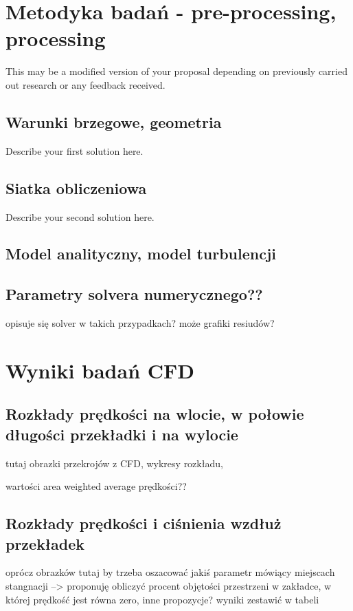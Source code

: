 \documentclass[peerreview]{IEEEtran}
\begin{document}

\section{Metodyka badań - pre-processing, processing}
This may be a modified version of your proposal depending on previously carried out research or any feedback received.  
\subsection{Warunki brzegowe, geometria}
Describe your first solution here.
\subsection{Siatka obliczeniowa}
Describe your second solution here.
\subsection{Model analityczny, model turbulencji}
\subsection{Parametry solvera numerycznego??}

opisuje się solver w takich przypadkach? może grafiki resiudów?



\section{Wyniki badań CFD} \label{sec:criteria}
\subsection{Rozkłady prędkości na wlocie, w połowie długości przekładki i na wylocie}
tutaj obrazki przekrojów z CFD, wykresy rozkładu, 

wartości area weighted average prędkości??

\subsection{Rozkłady prędkości i ciśnienia wzdłuż przekładek}

oprócz obrazków tutaj by trzeba oszacować jakiś parametr mówiący miejscach stangnacji --> proponuję obliczyć procent objętości przestrzeni w zakładce, w której prędkość jest równa zero, inne propozycje? wyniki zestawić w tabeli
\end{document}
